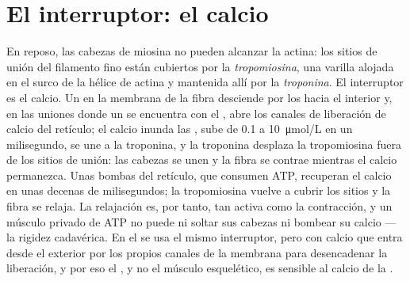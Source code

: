 \section{El interruptor: el calcio}

\begin{proposition}\label{prop:b2:muscle-movement:coupling}
En reposo, las cabezas de miosina no pueden alcanzar la actina: los sitios
de unión del filamento fino están cubiertos por la \emph{tropomiosina},
una varilla alojada en el surco de la hélice de actina y mantenida allí
por la \emph{troponina}. El interruptor es el calcio. Un  en la membrana de la fibra desciende por los  hacia el
interior y, en las uniones donde un  se encuentra con el , abre los canales de liberación de calcio del retículo; el
calcio inunda las , sube de \qty{0.1}{} a
\qty{10}{\micro mol/L} en un milisegundo, se une a la troponina, y la
troponina desplaza la tropomiosina fuera de los sitios de unión: las
cabezas se unen y la fibra se contrae mientras el calcio permanezca. Unas
bombas del retículo, que consumen ATP, recuperan el calcio en unas decenas
de milisegundos; la tropomiosina vuelve a cubrir los sitios y la fibra se
relaja. La relajación es, por tanto, tan activa como la contracción, y un
músculo privado de ATP no puede ni soltar sus cabezas ni bombear su
calcio --- la rigidez cadavérica. En el  se usa el mismo
interruptor, pero con calcio que entra desde el exterior por los propios
canales de la membrana para desencadenar la liberación, y por eso el
, y no el músculo esquelético, es sensible al calcio de la
.
\end{proposition}
